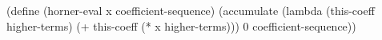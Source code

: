 \begtt\scm
(define (horner-eval x coefficient-sequence)
  (accumulate (lambda (this-coeff higher-terms)
                (+ this-coeff (* x higher-terms)))
              0
              coefficient-sequence))
\endtt
